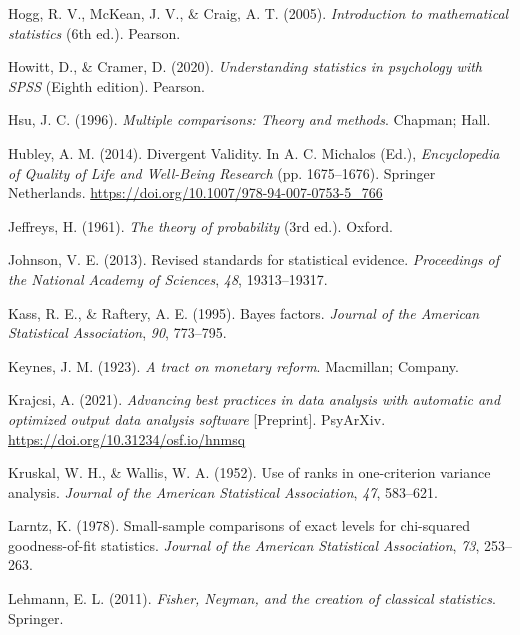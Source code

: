 \documentclass[
  11pt,
  a4paper,
  twoside,symmetric,openright]{book}
\theoremstyle{break}
\theoremstyle{break}
\begin{document}
\begin{CSLReferences}
Hogg, R. V., McKean, J. V., \& Craig, A. T. (2005). \emph{Introduction to mathematical statistics} (6th ed.). Pearson.

Howitt, D., \& Cramer, D. (2020). \emph{Understanding statistics in psychology with {SPSS}} (Eighth edition). {Pearson}.

Hsu, J. C. (1996). \emph{Multiple comparisons: Theory and methods}. Chapman; Hall.

Hubley, A. M. (2014). Divergent {Validity}. In A. C. Michalos (Ed.), \emph{Encyclopedia of {Quality} of {Life} and {Well-Being Research}} (pp. 1675--1676). {Springer Netherlands}. \url{https://doi.org/10.1007/978-94-007-0753-5_766}

Jeffreys, H. (1961). \emph{The theory of probability} (3rd ed.). Oxford.

Johnson, V. E. (2013). Revised standards for statistical evidence. \emph{Proceedings of the National Academy of Sciences}, \emph{48}, 19313--19317.

Kass, R. E., \& Raftery, A. E. (1995). Bayes factors. \emph{Journal of the American Statistical Association}, \emph{90}, 773--795.

Keynes, J. M. (1923). \emph{A tract on monetary reform}. Macmillan; Company.

Krajcsi, A. (2021). \emph{Advancing best practices in data analysis with automatic and optimized output data analysis software} {[}Preprint{]}. PsyArXiv. \url{https://doi.org/10.31234/osf.io/hnmsq}

Kruskal, W. H., \& Wallis, W. A. (1952). Use of ranks in one-criterion variance analysis. \emph{Journal of the American Statistical Association}, \emph{47}, 583--621.

Larntz, K. (1978). Small-sample comparisons of exact levels for chi-squared goodness-of-fit statistics. \emph{Journal of the American Statistical Association}, \emph{73}, 253--263.

Lehmann, E. L. (2011). \emph{Fisher, {N}eyman, and the creation of classical statistics}. Springer.


\end{CSLReferences}
\end{document}
